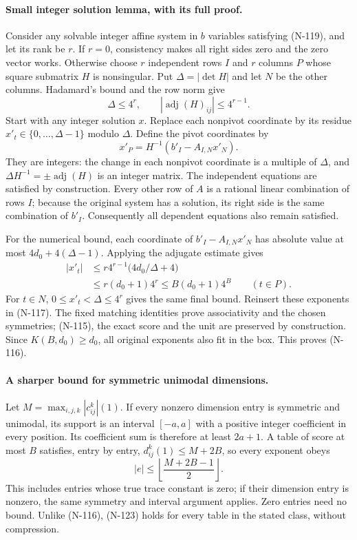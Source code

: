 \paragraph{Small integer solution lemma, with its full proof.}
Consider any solvable integer affine system in $b$ variables
satisfying (N-119), and let its rank be $r$.  If $r=0$, consistency
makes all right sides zero and the zero vector works.  Otherwise
choose $r$ independent rows $I$ and $r$ columns $P$ whose square
submatrix $H$ is nonsingular.  Put $\Delta=|\det H|$ and let $N$
be the other columns.  Hadamard's bound and the row norm give
\[
 \Delta\le4^r,
 \qquad |\operatorname{adj}(H)_{ij}|\le4^{r-1}.
 \tag{N-120}
\]
Start with any integer solution $x$.  Replace each nonpivot
coordinate by its residue $x'_t\in\{0,\ldots,\Delta-1\}$ modulo
$\Delta$.  Define the pivot coordinates by
\[
       x'_P=H^{-1}(b'_I-A_{I,N}x'_N).
 \tag{N-121}
\]
They are integers: the change in each nonpivot coordinate is a
multiple of $\Delta$, and
$\Delta H^{-1}=\pm\operatorname{adj}(H)$ is an integer matrix.
The independent equations are satisfied by construction.  Every
other row of $A$ is a rational linear combination of rows $I$;
because the original system has a solution, its right side is
the same combination of $b'_I$.  Consequently all dependent
equations also remain satisfied.

For the numerical bound, each coordinate of
$b'_I-A_{I,N}x'_N$ has absolute value at most
$4d_0+4(\Delta-1)$.  Applying the adjugate estimate gives
\[
 \begin{split}
 |x'_t|&\le r4^{r-1}\bigl(4d_0/\Delta+4\bigr)\\
       &\le r(d_0+1)4^r
          \le B(d_0+1)4^B\qquad(t\in P).
 \end{split}
 \tag{N-122}
\]
For $t\in N$, $0\le x'_t<\Delta\le4^r$ gives the same final
bound.  Reinsert these exponents in (N-117).  The fixed matching
identities prove associativity and the chosen symmetries; (N-115),
the exact score and the unit are preserved by construction.
Since $K(B,d_0)\ge d_0$, all original exponents also fit in
the box.  This proves (N-116).

\paragraph{A sharper bound for symmetric unimodal dimensions.}
Let $M=\max_{i,j,k}|c_{ij}^k|(1)$.  If every nonzero dimension
entry is symmetric and unimodal, its support is an interval
$[-a,a]$ with a positive integer coefficient in every position.
Its coefficient sum is therefore at least $2a+1$.  A table of
score at most $B$ satisfies, entry by entry,
$d_{ij}^k(1)\le M+2B$, so every exponent obeys
\[
                    |e|\le
             \left\lfloor\frac{M+2B-1}{2}\right\rfloor.
 \tag{N-123}
\]
This includes entries whose true trace constant is zero; if their
dimension entry is nonzero, the same symmetry and interval argument
applies.  Zero entries need no bound.  Unlike (N-116), (N-123)
holds for every table in the stated class, without compression.

